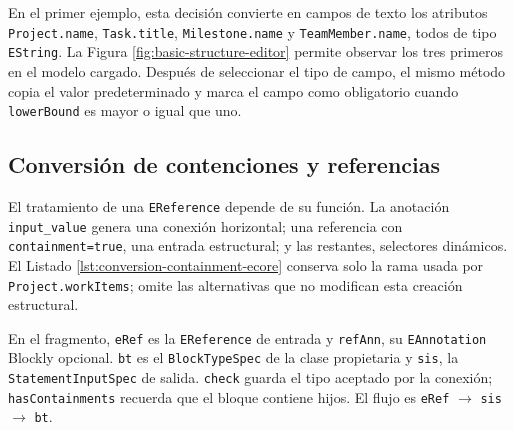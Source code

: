 En el primer ejemplo, esta decisión convierte en campos de texto los atributos
\texttt{Project.name}, \texttt{Task.title}, \texttt{Milestone.name} y
\texttt{TeamMember.name}, todos de tipo \texttt{EString}. La Figura
\ref{fig:basic-structure-editor} permite observar los tres primeros en el modelo
cargado. Después de seleccionar el tipo de campo, el mismo método copia el valor
predeterminado y marca el campo como obligatorio cuando \texttt{lowerBound} es
mayor o igual que uno.

\newpage
\subsection{Conversión de contenciones y referencias}

El tratamiento de una \texttt{EReference} depende de su función. La anotación
\texttt{input\_value} genera una conexión horizontal; una referencia con
\texttt{containment=true}, una entrada estructural; y las restantes, selectores
dinámicos. El Listado \ref{lst:conversion-containment-ecore} conserva solo la
rama usada por \texttt{Project.workItems}; omite las alternativas que no modifican
esta creación estructural.

En el fragmento, \texttt{eRef} es la \texttt{EReference} de entrada y
\texttt{refAnn}, su \texttt{EAnnotation} Blockly opcional. \texttt{bt} es el
\texttt{BlockTypeSpec} de la clase propietaria y \texttt{sis}, la
\texttt{Statement}\allowbreak\texttt{InputSpec} de salida. \texttt{check} guarda
el tipo aceptado por la conexión; \texttt{hasContainments} recuerda que el
bloque contiene hijos. El flujo es
\texttt{eRef} $\rightarrow$ \texttt{sis} $\rightarrow$ \texttt{bt}.

